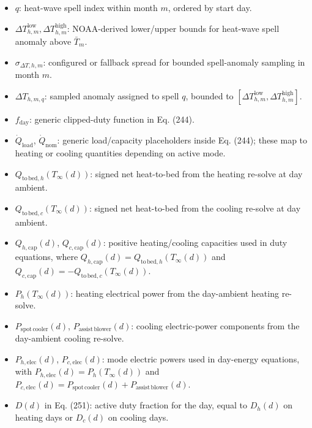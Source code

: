 \documentclass[11pt]{article}
\begin{document}
\begin{itemize}[leftmargin=*]
\item \(q\): heat-wave spell index within month \(m\), ordered by start day.
\item \(\Delta T_{h,m}^{\mathrm{low}},\Delta T_{h,m}^{\mathrm{high}}\): NOAA-derived lower/upper bounds for heat-wave spell anomaly above \(\bar T_m\).
\item \(\sigma_{\Delta T,h,m}\): configured or fallback spread for bounded spell-anomaly sampling in month \(m\).
\item \(\Delta T_{h,m,q}\): sampled anomaly assigned to spell \(q\), bounded to \([\Delta T_{h,m}^{\mathrm{low}},\Delta T_{h,m}^{\mathrm{high}}]\).
\item \(f_{\mathrm{day}}\): generic clipped-duty function in Eq. (244).
\item \(\dot Q_{\mathrm{load}}\), \(\dot Q_{\mathrm{nom}}\): generic load/capacity placeholders inside Eq. (244); these map to heating or cooling quantities depending on active mode.
\item \(Q_{\mathrm{to\,bed},h}(T_\infty(d))\): signed net heat-to-bed from the heating re-solve at day ambient.
\item \(Q_{\mathrm{to\,bed},c}(T_\infty(d))\): signed net heat-to-bed from the cooling re-solve at day ambient.
\item \(Q_{h,\mathrm{cap}}(d)\), \(Q_{c,\mathrm{cap}}(d)\): positive heating/cooling capacities used in duty equations, where \(Q_{h,\mathrm{cap}}(d)=Q_{\mathrm{to\,bed},h}(T_\infty(d))\) and \(Q_{c,\mathrm{cap}}(d)=-Q_{\mathrm{to\,bed},c}(T_\infty(d))\).
\item \(P_h(T_\infty(d))\): heating electrical power from the day-ambient heating re-solve.
\item \(P_{\mathrm{spot\,cooler}}(d)\), \(P_{\mathrm{assist\,blower}}(d)\): cooling electric-power components from the day-ambient cooling re-solve.
\item \(P_{h,\mathrm{elec}}(d)\), \(P_{c,\mathrm{elec}}(d)\): mode electric powers used in day-energy equations, with \(P_{h,\mathrm{elec}}(d)=P_h(T_\infty(d))\) and \(P_{c,\mathrm{elec}}(d)=P_{\mathrm{spot\,cooler}}(d)+P_{\mathrm{assist\,blower}}(d)\).
\item \(D(d)\) in Eq. (251): active duty fraction for the day, equal to \(D_h(d)\) on heating days or \(D_c(d)\) on cooling days.
\end{itemize}
\end{document}
